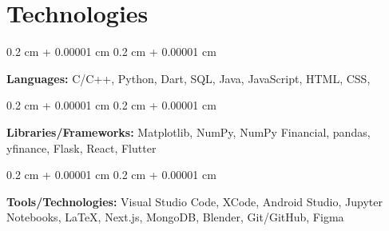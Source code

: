 \documentclass[10pt, letterpaper]{article}
\newenvironment{onecolentry}{
    \begin{adjustwidth}{
        0.2 cm + 0.00001 cm
    }{
        0.2 cm + 0.00001 cm
    }
}{
    \end{adjustwidth}
} %
\begin{document}
    
    \section{Technologies}



        
        \begin{onecolentry}
            \textbf{Languages:} C/C++, Python, Dart, SQL, Java, JavaScript, HTML, CSS,
        \end{onecolentry}

        \vspace{0.2 cm}

        \begin{onecolentry}
            \textbf{Libraries/Frameworks:} Matplotlib, NumPy, NumPy Financial, pandas, yfinance, Flask, React, Flutter
        \end{onecolentry}

        \vspace{0.2 cm}

        \begin{onecolentry}
            \textbf{Tools/Technologies:} Visual Studio Code, XCode, Android Studio, Jupyter Notebooks, LaTeX, Next.js, MongoDB, Blender, Git/GitHub, Figma
        \end{onecolentry}


    
\end{document}
